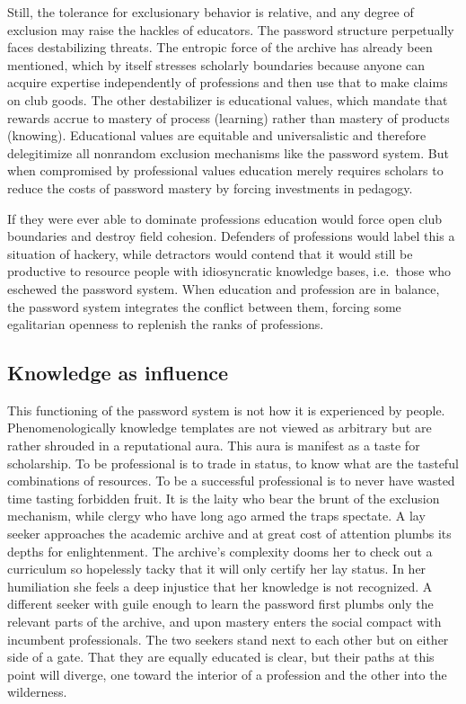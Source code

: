 \documentclass[]{book}
\theoremstyle{definition}
\theoremstyle{definition}
\theoremstyle{definition}
\theoremstyle{remark}
\begin{document}
Still, the tolerance for exclusionary behavior is relative, and any
degree of exclusion may raise the hackles of educators. The password
structure perpetually faces destabilizing threats. The entropic force of
the archive has already been mentioned, which by itself stresses
scholarly boundaries because anyone can acquire expertise independently
of professions and then use that to make claims on club goods. The other
destabilizer is educational values, which mandate that rewards accrue to
mastery of process (learning) rather than mastery of products (knowing).
Educational values are equitable and universalistic and therefore
delegitimize all nonrandom exclusion mechanisms like the password
system. But when compromised by professional values education merely
requires scholars to reduce the costs of password mastery by forcing
investments in pedagogy.

If they were ever able to dominate professions education would force
open club boundaries and destroy field cohesion. Defenders of
professions would label this a situation of hackery, while detractors
would contend that it would still be productive to resource people with
idiosyncratic knowledge bases, i.e.~those who eschewed the password
system. When education and profession are in balance, the password
system integrates the conflict between them, forcing some egalitarian
openness to replenish the ranks of professions.

\hypertarget{knowledge-as-influence}{%
\subsection{Knowledge as influence}\label{knowledge-as-influence}}

This functioning of the password system is not how it is experienced by
people. Phenomenologically knowledge templates are not viewed as
arbitrary but are rather shrouded in a reputational aura. This aura is
manifest as a taste for scholarship. To be professional is to trade in
status, to know what are the tasteful combinations of resources. To be a
successful professional is to never have wasted time tasting forbidden
fruit. It is the laity who bear the brunt of the exclusion mechanism,
while clergy who have long ago armed the traps spectate. A lay seeker
approaches the academic archive and at great cost of attention plumbs
its depths for enlightenment. The archive's complexity dooms her to
check out a curriculum so hopelessly tacky that it will only certify her
lay status. In her humiliation she feels a deep injustice that her
knowledge is not recognized. A different seeker with guile enough to
learn the password first plumbs only the relevant parts of the archive,
and upon mastery enters the social compact with incumbent professionals.
The two seekers stand next to each other but on either side of a gate.
That they are equally educated is clear, but their paths at this point
will diverge, one toward the interior of a profession and the other into
the wilderness.
\end{document}
